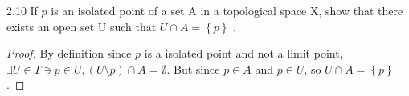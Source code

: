 \documentclass{article}
\newcommand{\R}{\mathbb{R}}
\newcommand{\Q}{\mathbb{Q}}
\begin{document}
\bigskip

\begin{PROB}{2.10}\label{Problem 2.10.}
    If $p$ is an isolated point of a set A in a topological space X, show that there exists an open set U such that $U \cap A = \left\{ p \right\}$ .
\end{PROB}
\begin{proof}
    By definition since $p$ is a isolated point and not a limit point, $\exists U \in T \ni p \in U, (U \setminus {p}) \cap A = \emptyset$. But since $p \in A$ and $p \in U$, so $U \cap A = \left\{ p \right\}$.      
\end{proof}

\bigskip

    
    
\end{document}
